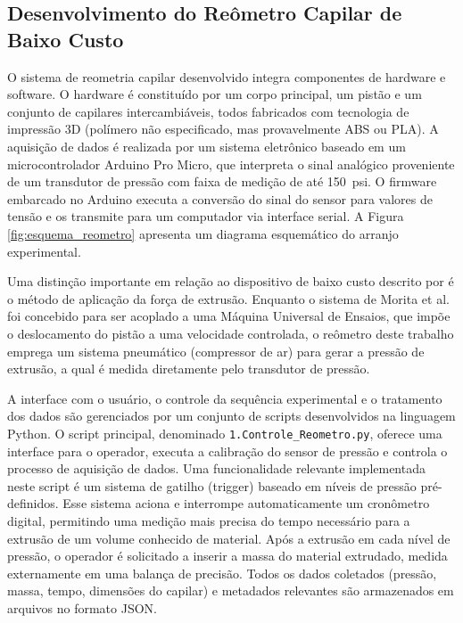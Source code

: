 \documentclass[article,12pt,oneside,a4paper,english,brazil,sumario=tradicional]{abntex2}
\begin{document}
\subsection{Desenvolvimento do Reômetro Capilar de Baixo Custo}
\label{subsubsec:reometro-capilar}
O sistema de reometria capilar desenvolvido integra componentes de hardware e software. O hardware é constituído por um corpo principal, um pistão e um conjunto de capilares intercambiáveis, todos fabricados com tecnologia de impressão 3D (polímero não especificado, mas provavelmente ABS ou PLA). A aquisição de dados é realizada por um sistema eletrônico baseado em um microcontrolador Arduino Pro Micro, que interpreta o sinal analógico proveniente de um transdutor de pressão com faixa de medição de até \SI{150}{psi}. O firmware embarcado no Arduino executa a conversão do sinal do sensor para valores de tensão e os transmite para um computador via interface serial. A Figura \ref{fig:esquema_reometro} apresenta um diagrama esquemático do arranjo experimental.

Uma distinção importante em relação ao dispositivo de baixo custo descrito por  é o método de aplicação da força de extrusão. Enquanto o sistema de Morita et al. foi concebido para ser acoplado a uma Máquina Universal de Ensaios, que impõe o deslocamento do pistão a uma velocidade controlada, o reômetro deste trabalho emprega um sistema pneumático (compressor de ar) para gerar a pressão de extrusão, a qual é medida diretamente pelo transdutor de pressão.

A interface com o usuário, o controle da sequência experimental e o tratamento dos dados são gerenciados por um conjunto de scripts desenvolvidos na linguagem Python. O script principal, denominado \texttt{1.Controle\_Reometro.py}, oferece uma interface para o operador, executa a calibração do sensor de pressão e controla o processo de aquisição de dados. Uma funcionalidade relevante implementada neste script é um sistema de gatilho (trigger) baseado em níveis de pressão pré-definidos. Esse sistema aciona e interrompe automaticamente um cronômetro digital, permitindo uma medição mais precisa do tempo necessário para a extrusão de um volume conhecido de material. Após a extrusão em cada nível de pressão, o operador é solicitado a inserir a massa do material extrudado, medida externamente em uma balança de precisão. Todos os dados coletados (pressão, massa, tempo, dimensões do capilar) e metadados relevantes são armazenados em arquivos no formato JSON.
\end{document}
